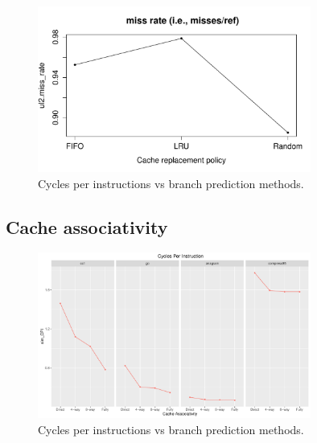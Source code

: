 \documentclass[10pt]{scrartcl}
\begin{document}
\begin{figure}[h]
  \centering
  \includegraphics[width=0.8\textwidth]{NewPlots/plot_RP_G_miss_rate}
  \caption{Cycles per instructions vs branch prediction methods.}\label{fig:cache-RP_G_miss_rate}
\end{figure}

\FloatBarrier

\subsection{Cache associativity}

\begin{figure}[h]
  \centering
  \includegraphics[width=0.8\textwidth]{Plots/plot_CacheA_sim_CPI}
  \caption{Cycles per instructions vs branch prediction methods.}\label{fig:cache-a_sim_cpi}
\end{figure}
\end{document}
